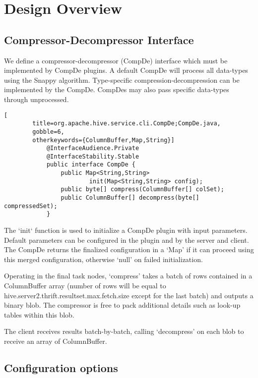 \documentclass[11pt,a4paper]{article}
\begin{document}
\section{Design Overview}

	\subsection{Compressor-Decompressor Interface}
		
		We define a compressor-decompressor (CompDe) interface which must be implemented by CompDe plugins.
		A default CompDe will process all data-types using the Snappy algorithm.
		Type-specific compression-decompression can be implemented by the CompDe.
		CompDes may also pass specific data-types through unprocessed.
		
		\begin{lstlisting}[
		title=org.apache.hive.service.cli.CompDe;CompDe.java,
		gobble=6,
		otherkeywords={ColumnBuffer,Map,String}]
			@InterfaceAudience.Private
			@InterfaceStability.Stable
			public interface CompDe {
				public Map<String,String>
				        init(Map<String,String> config);
				public byte[] compress(ColumnBuffer[] colSet);
				public ColumnBuffer[] decompress(byte[] compressedSet);
			}
		\end{lstlisting}
		
		The `init` function is used to initialize a CompDe plugin with input parameters.
		Default parameters can be configured in the plugin and by the server and client.
		The CompDe returns the finalized configuration in a `Map' if it can proceed using this merged configuration, otherwise `null' on failed initialization.
		
		Operating in the final task nodes, `compress' takes a batch of rows contained in a ColumnBuffer array (number of rows will be equal to \linebreak hive.server2.thrift.resultset.max.fetch.size except for the last batch) and outputs a binary blob.
		The compressor is free to pack additional details such as look-up tables within this blob.
		
		The client receives results batch-by-batch, calling `decompress' on each blob to receive an array of ColumnBuffer.
		
	\subsection{Configuration options}
		
\end{document}
